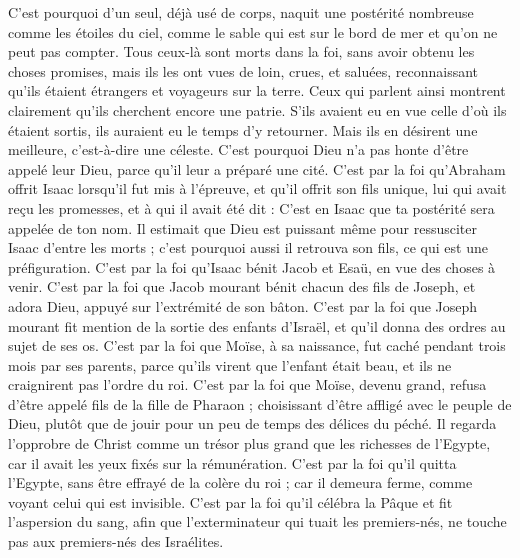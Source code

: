 \begin{multicols}{2}
C'est pourquoi d'un seul, déjà usé de corps, naquit une postérité nombreuse comme les étoiles du ciel, comme le sable qui est sur le bord de mer et qu’on ne peut pas compter.
Tous ceux-là sont morts dans la foi, sans avoir obtenu les choses promises, mais ils les ont vues de loin, crues, et saluées, reconnaissant qu'ils étaient étrangers et voyageurs sur la terre.
Ceux qui parlent ainsi montrent clairement qu'ils cherchent encore une patrie.
S’ils avaient eu en vue celle d’où ils étaient sortis, ils auraient eu le temps d’y retourner.
Mais ils en désirent une meilleure, c'est-à-dire une céleste. C’est pourquoi Dieu n’a pas honte d'être appelé leur Dieu, parce qu'il leur a préparé une cité.
C’est par la foi qu’Abraham offrit Isaac lorsqu’il fut mis à l’épreuve, et qu’il offrit son fils unique, lui qui avait reçu les promesses,
et à qui il avait été dit : C’est en Isaac que ta postérité sera appelée de ton nom.
Il estimait que Dieu est puissant même pour ressusciter Isaac d'entre les morts ; c'est pourquoi aussi il retrouva son fils, ce qui est une préfiguration.
C’est par la foi qu’Isaac bénit Jacob et Esaü, en vue des choses à venir.
C’est par la foi que Jacob mourant bénit chacun des fils de Joseph, et adora Dieu, appuyé sur l’extrémité de son bâton.
C’est par la foi que Joseph mourant fit mention de la sortie des enfants d'Israël, et qu’il donna des ordres au sujet de ses os.
C’est par la foi que Moïse, à sa naissance, fut caché pendant trois mois par ses parents, parce qu’ils virent que l’enfant était beau, et ils ne craignirent pas l’ordre du roi.
C’est par la foi que Moïse, devenu grand, refusa d'être appelé fils de la fille de Pharaon ;
choisissant d’être affligé avec le peuple de Dieu, plutôt que de jouir pour un peu de temps des délices du péché.
Il regarda l'opprobre de Christ comme un trésor plus grand que les richesses de l'Egypte, car il avait les yeux fixés sur la rémunération.
C’est par la foi qu’il quitta l'Egypte, sans être effrayé de la colère du roi ; car il demeura ferme, comme voyant celui qui est invisible.
C’est par la foi qu’il célébra la Pâque et fit l'aspersion du sang, afin que l’exterminateur qui tuait les premiers-nés, ne touche pas aux premiers-nés des Israélites.

\end{multicols}

